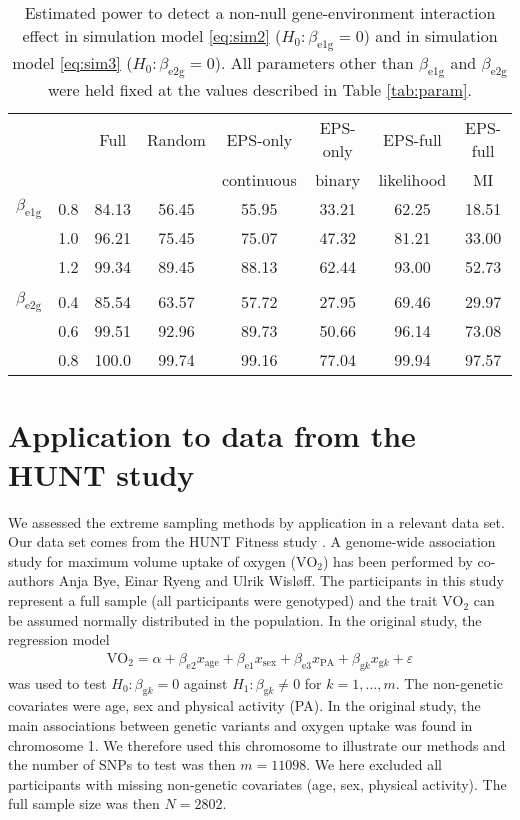 \documentclass[10pt,a4paper]{article}
\def\betagk{\beta_{\text{g}k}}
\begin{document}
\begin{table}[h]
\centering
	\begin{tabular}{cccccccc}
	\hline
	\rule{0pt}{2.5ex}
	& & Full & Random & EPS-only  & EPS-only & EPS-full & EPS-full \\
	&&&& continuous & binary & likelihood & MI \\
	\hline
	\rule{0pt}{2.5ex}
$\beta_{\text{e}1\text{g}}$ &0.8 & 84.13 & 56.45 & 55.95 & 33.21 & 62.25 & 18.51 \\ 
  &1.0 & 96.21 & 75.45 & 75.07 & 47.32 & 81.21 & 33.00 \\ 
  &1.2 & 99.34 & 89.45 & 88.13 & 62.44 & 93.00 & 52.73 \\   \\
	\rule{0pt}{3ex}
$\beta_{\text{e}2\text{g}}$ & 0.4 & 85.54 & 63.57 & 57.72 & 27.95 & 69.46 & 29.97 \\ 
  &0.6 & 99.51 & 92.96 & 89.73 & 50.66 & 96.14 & 73.08 \\ 
  &0.8 & 100.0 & 99.74 & 99.16 & 77.04 & 99.94 & 97.57 \\ 
	\hline
	\end{tabular}
	\caption{Estimated power to detect a non-null gene-environment interaction effect in simulation model \eqref{eq:sim2} ($H_0: \beta_{\text{e}1\text{g}} = 0$) and in simulation model \eqref{eq:sim3} ($H_0: \beta_{\text{e}2\text{g}} = 0$). All parameters other than $\beta_{\text{e}1\text{g}}$ and $\beta_{\text{e}2\text{g}}$ were held fixed at the values described in Table \ref{tab:param}.}
	\label{tab:sim2}
\end{table}


\section{Application to data from the HUNT study}
We assessed the extreme sampling methods by application in a relevant data set. Our data set comes from the HUNT Fitness study \citep{aspenes2011physical}. A genome-wide association study for maximum volume uptake of oxygen ($\text{VO}_2$) has been performed by co-authors Anja Bye, Einar Ryeng and Ulrik Wisløff. The participants in this study represent a full sample (all participants were genotyped) and the trait $\text{VO}_2$ can be assumed normally distributed in the population. In the original study, the regression model
\begin{align*}
\text{VO}_2 = \alpha + \beta_{\text{e}2} x_{\text{age}} + \beta_{\text{e}1}x_{\text{sex}} + \beta_{\text{e}3} x_{\text{PA}} + \betagk x_{\text{g}k} + \varepsilon
\end{align*}
was used to test $H_0: \betagk = 0$ against $H_1: \betagk \neq 0$ for $k = 1,\ldots,m$. The non-genetic covariates were age, sex and physical activity (PA). In the original study, the main associations between genetic variants and oxygen uptake was found in chromosome 1. We therefore used this chromosome to illustrate our methods and the number of SNPs to test was then $m = 11098$. We here excluded all participants with missing non-genetic covariates (age, sex, physical activity). The full sample size was then $N=2802$.
\end{document}
